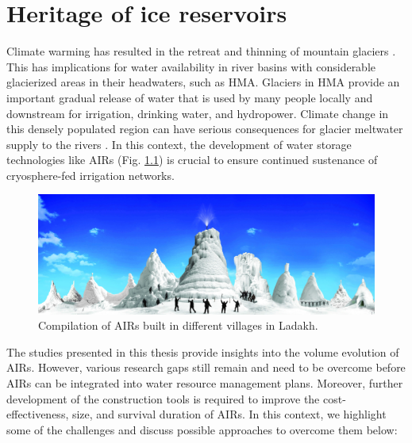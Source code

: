 \chapter{Heritage of ice reservoirs}


Climate warming has resulted in the retreat and thinning of mountain glaciers
\citep{ipccCrossChapterPaperMountains2022}. This has implications for water availability in river basins with
considerable glacierized areas in their headwaters, such as \ac{HMA}. Glaciers in \ac{HMA} provide an important
gradual release of water that is used by many people locally and downstream for irrigation, drinking water, and
hydropower. Climate change in this densely populated region can have serious consequences for glacier meltwater
supply to the rivers \citep{immerzeelImportanceVulnerabilityWorld2020}. In this context, the development of
water storage technologies like \ac{AIRs} (Fig. \ref{fig:airs_ladakh}) is crucial to ensure continued sustenance
of cryosphere-fed irrigation networks.

\begin{figure}
	\includegraphics[width=\textwidth]{figs/AIRs_Ladakh}
	\caption{Compilation of \ac{AIRs} built in different villages in Ladakh.}
	\label{fig:airs_ladakh}
\end{figure}

The studies presented in this thesis provide insights into the volume evolution of \ac{AIRs}. However, various
research gaps still remain and need to be overcome before \ac{AIRs} can be integrated into water resource
management plans. Moreover, further development of the construction tools is required to improve the
cost-effectiveness, size, and survival duration of \ac{AIRs}. In this context, we highlight some of the
challenges and discuss possible approaches to overcome them below:

